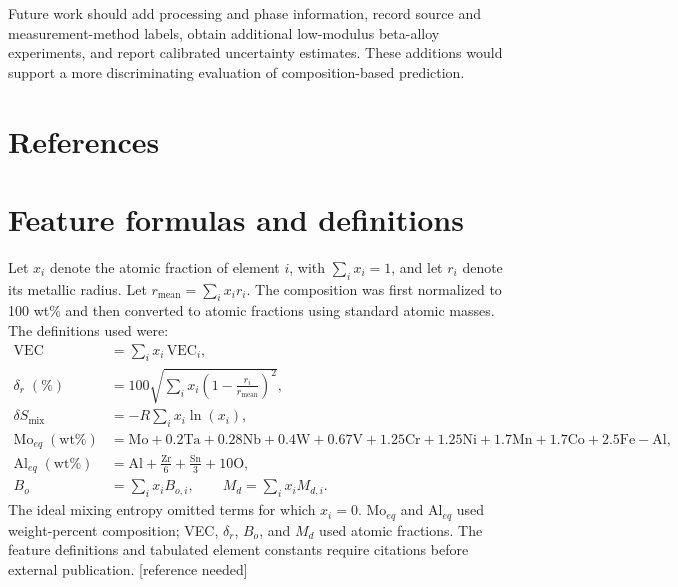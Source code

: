 \documentclass[11pt,oneside]{article}
\begin{document}
Future work should add processing and phase information, record source and measurement-method labels, obtain additional low-modulus beta-alloy experiments, and report calibrated uncertainty estimates. These additions would support a more discriminating evaluation of composition-based prediction.

\section*{References}

\appendix
\section{Feature formulas and definitions}
Let \(x_i\) denote the atomic fraction of element \(i\), with \(\sum_i x_i=1\), and let \(r_i\) denote its metallic radius. Let \(r_{\mathrm{mean}}=\sum_i x_i r_i\). The composition was first normalized to 100 wt\% and then converted to atomic fractions using standard atomic masses. The definitions used were:
\begin{align}
\mathrm{VEC} &= \sum_i x_i\,\mathrm{VEC}_i,\\
\delta_r\;(\%) &= 100\sqrt{\sum_i x_i\left(1-\frac{r_i}{r_{\mathrm{mean}}}\right)^2},\\
\delta S_{\mathrm{mix}} &= -R\sum_i x_i\ln(x_i),\\
\mathrm{Mo}_{eq}\;(\mathrm{wt}\%) &= \mathrm{Mo}+0.2\mathrm{Ta}+0.28\mathrm{Nb}+0.4\mathrm{W}
+0.67\mathrm{V}+1.25\mathrm{Cr}+1.25\mathrm{Ni}+1.7\mathrm{Mn}
+1.7\mathrm{Co}+2.5\mathrm{Fe}-\mathrm{Al},\\
\mathrm{Al}_{eq}\;(\mathrm{wt}\%) &= \mathrm{Al}+\frac{\mathrm{Zr}}{6}
+\frac{\mathrm{Sn}}{3}+10\mathrm{O},\\
B_o &= \sum_i x_i B_{o,i},\qquad
M_d = \sum_i x_i M_{d,i}.
\end{align}
The ideal mixing entropy omitted terms for which \(x_i=0\). \(\mathrm{Mo}_{eq}\) and \(\mathrm{Al}_{eq}\) used weight-percent composition; VEC, \(\delta_r\), \(B_o\), and \(M_d\) used atomic fractions. The feature definitions and tabulated element constants require citations before external publication. [reference needed]
\end{document}
